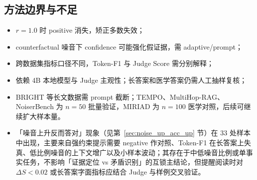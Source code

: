 \documentclass[UTF8,zihao=-4]{ctexart}
\begin{document}
\subsection{方法边界与不足}
\begin{itemize}
  \item $r=1.0$ 时 positive 消失，矫正多数失效；
  \item counterfactual 噪音下 confidence 可能强化假证据，需 adaptive/prompt；
  \item 跨数据集指标口径不同，Token-F1 与 Judge Score 需分别解释；
  \item 依赖 4B 本地模型与 Judge 主观性；长答案和医学答案仍需人工抽样复核；
  \item BRIGHT 等长文数据需 prompt 截断；TEMPO、MultiHop-RAG、NoiserBench 为 $n=50$ 批量验证，MIRIAD 为 $n=100$ 医学对照，后续可继续扩大样本量。
  \item 「噪音上升反而答对」现象（见第~\ref{sec:noise_up_acc_up} 节）在 33 处样本中出现，主要来自强约束提示需要 negative 作对照、Token-F1 在长答案上失真、低比例噪音的上下文增广以及小样本波动；其存在于中低噪音比例或单事实任务，不影响「证据定位 vs 矛盾识别」的互锁主结论，但提醒阅读时对 $\Delta S<0.02$ 或长答案字面指标应结合 Judge 与样例交叉验证。
\end{itemize}
\end{document}
